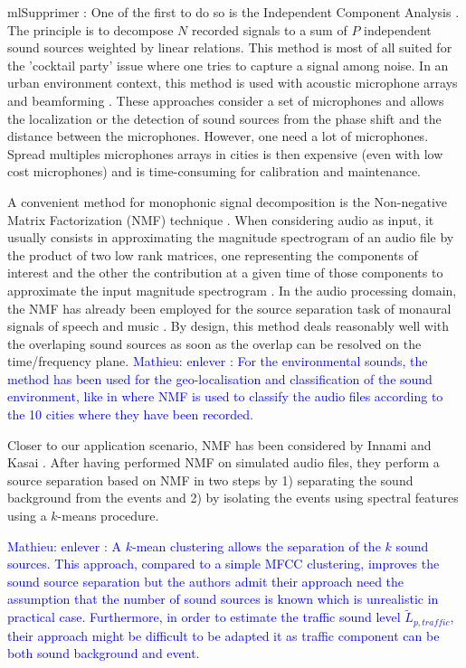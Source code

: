 \documentclass[twocolumn,a4paper,10pt]{article}
\newcommand{\ml}[1]{\textcolor{blue}{ Mathieu: #1}}
\begin{document}
ml{Supprimer : One of the first to do so is the Independent Component Analysis \cite{comon_independent_1994}. The principle is to decompose $N$ recorded signals to a sum of $P$ independent sound sources weighted by linear relations. This method is most of all suited for the 'cocktail party' issue where one tries to capture a signal among noise. In an urban environment context, this method is used with acoustic microphone arrays and beamforming \cite{saruwatari2003blind}. These approaches consider a set of microphones and allows the localization \cite{mennitt2010multiple} or the detection \cite{leiba2017large} of sound sources from the phase shift and the distance between the microphones. However, one need a lot of microphones. Spread multiples microphones arrays in cities is then expensive (even with low cost microphones) and is time-consuming for calibration and maintenance.}

A convenient method for monophonic signal decomposition is the Non-negative Matrix Factorization (NMF) technique \cite{lee_learning_1999}. When considering audio as input, it usually consists in approximating the magnitude spectrogram of an audio file by the product of two low rank matrices, one representing the components of interest and the other the contribution at a given time of those components to approximate the input magnitude spectrogram \cite{smaragdis_non-negative_2003} \cite{wilson_speech_2008} \cite{mesaros_sound_2015}. In the audio processing domain, the NMF has already been employed for the source separation task of monaural signals of speech and music \cite{wang_musical_2005} \cite{wilson_speech_2008}. By design, this method deals reasonably well with the overlaping sound sources as soon as the overlap can be resolved on the time/frequency plane. \ml{enlever : For the environmental sounds, the method has been used for the geo-localisation and classification of the sound environment, like in \cite{kumar_audio_2016} where NMF is used to classify the audio files according to the 10 cities where they have been recorded.}

Closer to our application scenario, NMF has been considered by Innami and Kasai \cite{satoshi_innami_nmf-based_2012}. After having performed NMF on simulated audio files, they perform a source separation based on NMF in two steps by 1) separating the sound background from the events and 2) by isolating the events using spectral features using a $k$-means procedure.



\ml{ enlever : A $k$-mean clustering allows the separation of the $k$ sound sources. This approach, compared to a simple MFCC clustering, improves the sound source separation but the authors admit their approach need the assumption that the number of sound sources is known which is unrealistic in practical case.  Furthermore, in order to estimate the traffic sound level $\tilde{L}_{p,traffic}$, their approach might be difficult to be adapted it as traffic component can be both sound background and event.}
\end{document}

